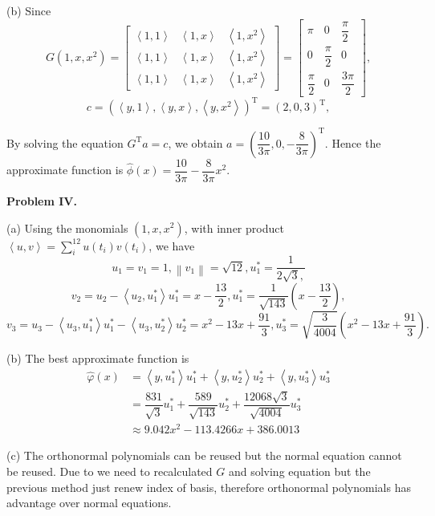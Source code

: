 \documentclass[UTF8]{ctexart}
\newcommand{\avg}[1]{\left\langle #1 \right\rangle}
\newcommand{\norm}[1]{\left\| #1 \right\|}
\begin{document}
(b) Since
\[
	G(1,x,x^2) =
	\left[ {\begin{array}{ccc}
					\avg{1,1} & \avg{1,x} & \avg{1,x^2} \\
					\avg{1,1} & \avg{1,x} & \avg{1,x^2} \\
					\avg{1,1} & \avg{1,x} & \avg{1,x^2}
				\end{array} } \right]
	=\left[ {\begin{array}{ccc}
					\pi            & 0              & \dfrac{\pi}{2}  \\
					0              & \dfrac{\pi}{2} & 0               \\
					\dfrac{\pi}{2} & 0              & \dfrac{3\pi}{2}
				\end{array} } \right],
\]
\[ c = (\avg{y,1} , \avg{y,x} , \avg{y,x^2} )^{\mathrm{T}} = (2,0,3)^{\mathrm{T}},\]

By solving the equation $G^{\mathrm{T}}a=c$, we obtain $a = (\dfrac{10}{3\pi} , 0 , -\dfrac{8}{3\pi})^{\mathrm{T}}$. Hence the approximate function is $\hat{\phi}(x) = \dfrac{10}{3\pi} -\dfrac{8}{3\pi}x^2$.

\quad

\textbf{Problem IV. }

(a) Using the monomials $(1,x,x^2)$, with inner product$\avg{u,v} = \sum_i^{12}u(t_i)v(t_i)$, we have
\[ u_1=v_1=1, \norm{v_1}=\sqrt{12} , u_1^* = \dfrac{1}{2\sqrt{3},}\]
\[v_2 = u_2 -\avg{u_2,u_1^*}u_1^* = x - \dfrac{13}{2}, u_1^* = \dfrac{1}{\sqrt{143}}(x-\dfrac{13}{2}),\]
\[v_3 = u_3 - \avg{u_3,u_1^*}u_1^* - \avg{u_3,u_2^*}u_2^* = x^2 -13x + \dfrac{91}{3}, u_3^* = \sqrt{\dfrac{3}{4004}}(x^2-13x+\dfrac{91}{3}).\]

(b) The best approximate function is
\[
	\begin{aligned}
		\hat{\varphi}(x) & = \avg{y,u_1^*}u_1^* +\avg{y,u_2^*}u_2^* + \avg{y,u_3^*}u_3^* \\
		                 & = \dfrac{831}{\sqrt{3}}u_1^* + \dfrac{589}{\sqrt{143}}u_2^*
		+ \dfrac{12068\sqrt{3}}{\sqrt{4004}}u_3^*                                        \\
		                 & \approx 9.042x^2 - 113.4266x+386.0013
	\end{aligned}
\]

(c) The orthonormal polynomials can be reused but the normal equation cannot be reused. Due to we need to recalculated $G$ and solving equation but the previous method just renew index of basis, therefore orthonormal polynomials has advantage over normal equations.

\quad
\end{document}
